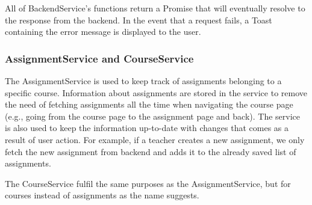 All of BackendService's functions return a Promise that will eventually resolve to the response from the backend. In the event that a request fails, a Toast containing the error message is displayed to the user. 

\subsubsection{AssignmentService and CourseService}
The AssignmentService is used to keep track of assignments belonging to a specific course. Information about assignments are stored in the service to remove the need of fetching assignments all the time when navigating the course page (e.g., going from the course page to the assignment page and back). The service is also used to keep the information up-to-date with changes that comes as a result of user action. For example, if a teacher creates a new assignment, we only fetch the new assignment from backend and adds it to the already saved list of assignments.

The CourseService fulfil the same purposes as the AssignmentService, but for courses instead of assignments as the name suggests.